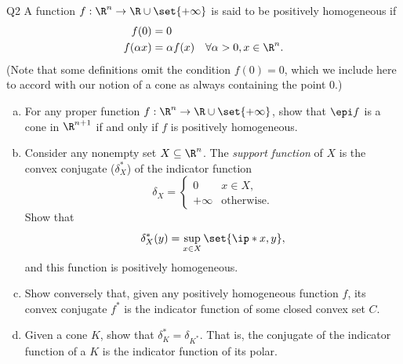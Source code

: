 \documentclass{article}
\theoremstyle{plain}
\theoremstyle{definition}
\theoremstyle{remark}
\begin{document}
\begin{problem}
    {Q2}
    A function $f:\R^n\rightarrow\R\cup\set{+\infty}$ is said to be positively homogeneous if
    \begin{align*}
        f(0) &= 0 \\
        f(\alpha x) &= \alpha f(x) \quad \forall \alpha > 0, x\in\R^n.
    \end{align*}
    (Note that some definitions omit the condition $f(0) = 0$, which we include here to accord with our notion of a cone as always containing the point $0$.)
    \begin{enumerate}[(a)]
        \item For any proper function $f:\R^n\rightarrow\R\cup\set{+\infty}$, show that $\epi f$ is a cone in $\R^{n+1}$ if and only if $f$ is positively homogeneous.
        \item Consider any nonempty set $X\subseteq\R^n$. The \textit{support function} of $X$ is the convex conjugate ($\delta_X^*$) of the indicator function \[\delta_X = \begin{cases}
            0 & x\in X,\\
            +\infty & \text{otherwise}.
        \end{cases}\]
        Show that \[\delta_X^*(y)=\sup_{x\in X}\set{\ip*{x, y}},\] and this function is positively homogeneous.
        \item Show conversely that, given any positively homogeneous function $f$, its convex conjugate $f^*$ is the indicator function of some closed convex set $C$.
        \item Given a cone $K$, show that $\delta_K^* = \delta_{K^*}$. That is, the conjugate of the indicator function of a $K$ is the indicator function of its polar.
    \end{enumerate}
\end{problem}
\end{document}
